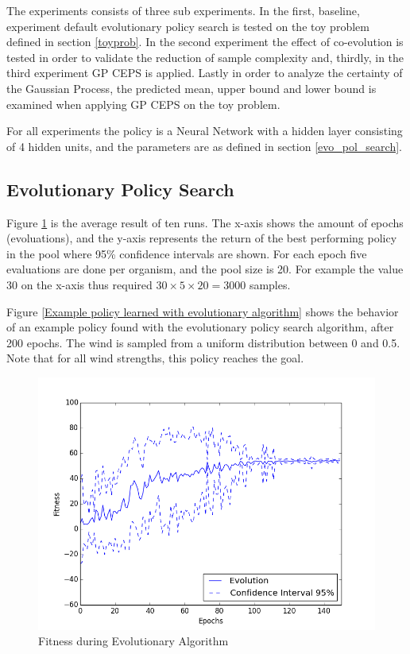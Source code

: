 The experiments consists of three sub experiments. In the first, baseline, experiment default evolutionary policy search is tested on the toy problem defined in section \ref{toyprob}. In the second experiment the effect of co-evolution is tested in order to validate the reduction of sample complexity and, thirdly, in the third experiment GP CEPS is applied. Lastly in order to analyze the certainty of the Gaussian Process, the predicted mean, upper bound and lower bound is examined when applying GP CEPS on the toy problem.

For all experiments the policy is a Neural Network with a hidden layer consisting of 4 hidden units, and the parameters are as defined in section \ref{evo_pol_search}. 

\subsection{Evolutionary Policy Search}

Figure \ref{Fitness during Evolutionary Algorithm} is the average result of ten runs. The x-axis shows the amount of epochs (evoluations), and the y-axis represents the return of the best performing policy in the pool where 95\% confidence intervals are shown. For each epoch five evaluations are done per organism, and the pool size is 20. For example the value 30 on the x-axis thus required $30 \times 5 \times 20 = 3000$ samples.

Figure \ref{Example policy learned with evolutionary algorithm} shows the behavior of an example policy found with the evolutionary policy search algorithm, after 200 epochs. The wind is sampled from a uniform distribution between 0 and 0.5. Note that for all wind strengths, this policy reaches the goal. 

\begin{figure}[!htb]
  \centering
  \includegraphics[scale=0.5]{images/evo.png}
  \caption{Fitness during Evolutionary Algorithm}\label{Fitness during Evolutionary Algorithm}
\end{figure}

